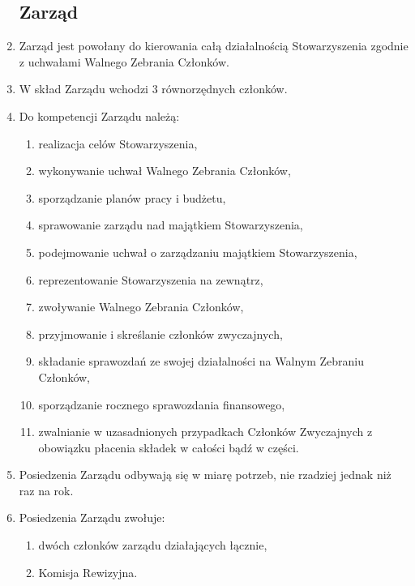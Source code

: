 \documentclass{article}
\begin{document}
\begin{enumerate}
	\subsection{Zarząd}
	    \item Zarząd jest powołany do kierowania całą działalnością Stowarzyszenia zgodnie z uchwałami Walnego Zebrania Członków.
	    \item W skład Zarządu wchodzi 3 równorzędnych członków.
	    \item Do kompetencji Zarządu należą:
	      \begin{enumerate}
	        \item realizacja celów Stowarzyszenia,
	        \item wykonywanie uchwał Walnego Zebrania Członków,
	        \item sporządzanie planów pracy i budżetu,
	        \item sprawowanie zarządu nad majątkiem Stowarzyszenia,
	        \item podejmowanie uchwał o zarządzaniu majątkiem Stowarzyszenia,
	        \item reprezentowanie Stowarzyszenia na zewnątrz,
	        \item zwoływanie Walnego Zebrania Członków,
	        \item przyjmowanie i skreślanie członków zwyczajnych,
	        \item składanie sprawozdań ze swojej działalności na Walnym Zebraniu Członków,
	        \item sporządzanie rocznego sprawozdania finansowego,
	        \item zwalnianie w uzasadnionych przypadkach Członków Zwyczajnych z obowiązku płacenia składek w całości bądź w części.
	      \end{enumerate}
	    \item Posiedzenia Zarządu odbywają się w miarę potrzeb, nie rzadziej jednak niż raz na rok.
	    \item Posiedzenia Zarządu zwołuje:
	      \begin{enumerate}
	        \item dwóch członków zarządu działających łącznie,
	        \item Komisja Rewizyjna.
	      \end{enumerate}

\end{enumerate}
\end{document}

